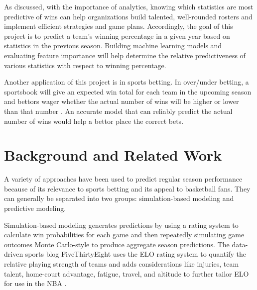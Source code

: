 \documentclass[pageno]{jpaper}
\begin{document}
As discussed, with the importance of analytics, knowing which statistics are most predictive of wins can help organizations build talented, well-rounded rosters and implement efficient strategies and game plans. Accordingly, the goal of this project is to predict a team's winning percentage in a given year based on statistics in the previous season. Building machine learning models and evaluating feature importance will help determine the relative predictiveness of various statistics with respect to winning percentage.

Another application of this project is in sports betting. In over/under betting, a sportsbook will give an expected win total for each team in the upcoming season and bettors wager whether the actual number of wins will be higher or lower than that number \cite{overunder}. An accurate model that can reliably predict the actual number of wins would help a bettor place the correct bets.

\section{Background and Related Work}
\label{section:prevwork}

A variety of approaches have been used to predict regular season performance because of its relevance to sports betting and its appeal to basketball fans. They can generally be separated into two groups: simulation-based modeling and predictive modeling.

Simulation-based modeling generates predictions by using a rating system to calculate win probabilities for each game and then repeatedly simulating game outcomes Monte Carlo-style to produce aggregate season predictions. The data-driven sports blog FiveThirtyEight uses the ELO rating system to quantify the relative playing strength of teams and adds considerations like injuries, team talent, home-court advantage, fatigue, travel, and altitude to further tailor ELO for use in the NBA \cite{538elo}.
\end{document}
